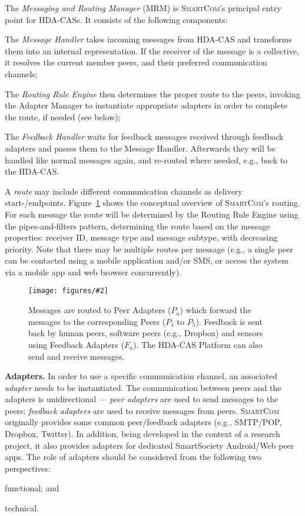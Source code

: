 \documentclass{llncs}
\newcommand{\mdl}{\textsc{SmartCom}}
\newcommand{\figfloat}[3][0.9]{
\begin{figure}[h] 
\centering
\texttt{[image: figures/\#2]}
\caption{#3}
\label{fig:#2}
\end{figure}
}
\begin{document}
    The \emph{Messaging and Routing Manager} (MRM) is \mdl's principal entry point for HDA-CASs. It consists of the following components:
    \begin{inparaenum}
      \item The \emph{Message Handler} takes incoming messages from HDA-CAS and transforms them into an internal representation. If the receiver of the message is a collective, it resolves the current member peers, and their preferred communication channels; 
      \item The \emph{Routing Rule Engine} then determines the proper route to the peers, invoking the Adapter Manager to instantiate appropriate adapters in order to complete the route, if needed (see below); 
      \item The \emph{Feedback Handler} waits for feedback messages received through feedback adapters and  passes them to the Message Handler. Afterwards they will be handled like normal messages again, and re-routed where needed, e.g., back to the HDA-CAS.
    \end{inparaenum}
    A \emph{route} may include different communication channels as delivery start-/endpoints. Figure~\ref{fig:routes} shows the conceptual overview of \mdl's routing. For each message the route will be determined by the Routing Rule Engine using the pipes-and-filters pattern, determining the route based on the  message properties: receiver ID, message type and message subtype, with decreasing priority. 
    Note that there may be multiple routes per message (e.g., a single peer can be contacted using a mobile application and/or SMS, or access the system via a mobile app and web browser concurrently).

    \figfloat[.75]{routes}{Messages are routed to Peer Adapters ($P_a$) which forward the messages to the corresponding Peers ($P_1$ to $P_5$). Feedback is sent back by human peers, software peers (e.g., Dropbox) and sensors using Feedback Adapters ($F_a$). The HDA-CAS Platform can also send and receive messages.}

  \textbf{Adapters. }
    In order to use a specific communication channel, an associated \emph{adapter} needs to be instantiated. The communication between peers and the adapters is unidirectional --- \emph{peer adapters} are used to send messages to the peers; \emph{feedback adapters} are used to receive messages from peers. 
    \mdl{} originally provides some common peer/feedback adapters  (e.g., SMTP/POP, Dropbox, Twitter). In addition, being developed in the context of a research project, it also provides adapters for dedicated SmartSociety Android/Web peer apps. 
    The role of adapters should be considered from the following two perspectives:
    \begin{inparaenum}[\itshape 1)]
    \item functional; and 
    \item technical.
    \end{inparaenum}
    
\end{document}
